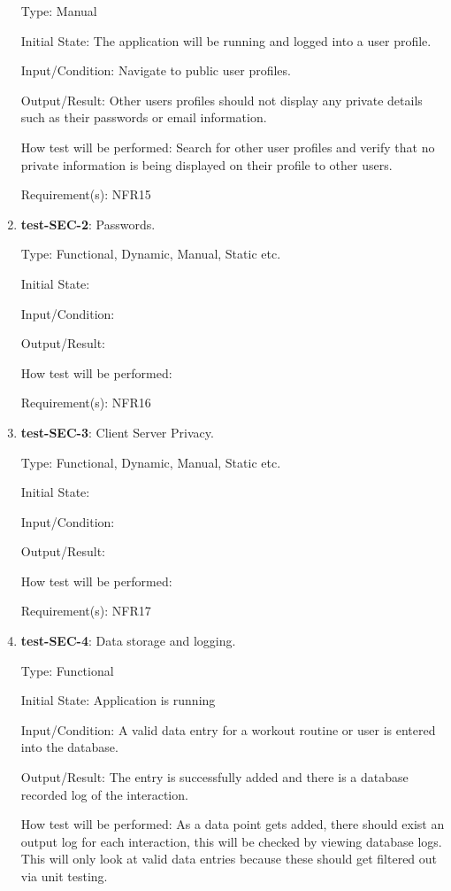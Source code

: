 \documentclass[12pt, titlepage]{article}
\begin{document}
\begin{enumerate}
		Type: Manual
		
		Initial State: The application will be running and logged into a user profile. 
		
		Input/Condition: Navigate to public user profiles.
		
		Output/Result: Other users profiles should not display any private details such as their passwords or email information. 
		
		How test will be performed: Search for other user profiles and verify that no private information is being displayed on their profile to other users.
		
		Requirement(s): NFR15
		
		\item{\textbf{test-SEC-2}}: Passwords.
		
		Type: Functional, Dynamic, Manual, Static etc.
		
		Initial State: 
		
		Input/Condition: 
		
		Output/Result: 
		
		How test will be performed: 
		
		Requirement(s): NFR16
		
		\item{\textbf{test-SEC-3}}: Client Server Privacy.
		
		Type: Functional, Dynamic, Manual, Static etc.
		
		Initial State: 
		
		Input/Condition: 
		
		Output/Result: 
		
		How test will be performed: 
	
		Requirement(s): NFR17
		
		\item{\textbf{test-SEC-4}}: Data storage and logging.
		
		Type: Functional
		
		Initial State: Application is running 
		
		Input/Condition: A valid data entry for a workout routine or user is entered into the database.
		
		Output/Result: The entry is successfully added and there is a database recorded log of the interaction.
		
		How test will be performed: As a data point gets added, there should exist an output log for each interaction, this will be checked by viewing database logs. This will only look at valid data entries because these should get filtered out via unit testing.
		

\end{enumerate}
\end{document}
